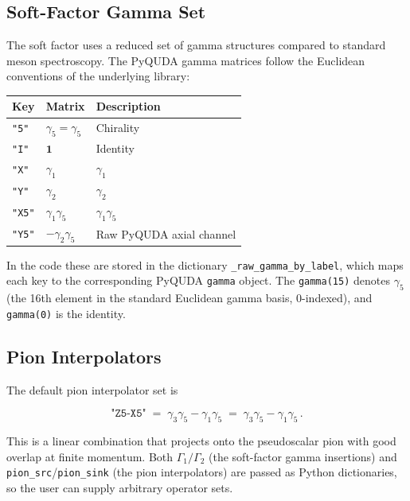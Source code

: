 \documentclass[11pt,a4paper]{article}
\newcommand{\Gfive}{\gamma_{5}}
\newcommand{\Gone}{\gamma_{1}}
\newcommand{\Gtwo}{\gamma_{2}}
\newcommand{\Gthree}{\gamma_{3}}
\newcommand{\walltag}[1]{\texttt{#1}}
\newcommand{\gI}{\mathbf{1}}
\begin{document}
\subsection{Soft-Factor Gamma Set}

The soft factor uses a reduced set of gamma structures compared to standard meson
spectroscopy.  The PyQUDA gamma matrices follow the Euclidean conventions of the
underlying library:

\begin{center}
\begin{tabular}{lll}
\toprule
Key & Matrix & Description \\
\midrule
\walltag{"5"}  & $\Gfive = \gamma_{5}$          & Chirality \\
\walltag{"I"}  & $\gI$                          & Identity \\
\walltag{"X"}  & $\Gone$                        & $\gamma_{1}$ \\
\walltag{"Y"}  & $\Gtwo$                        & $\gamma_{2}$ \\
\walltag{"X5"} & $\Gone\Gfive$                  & $\gamma_{1}\gamma_{5}$ \\
\walltag{"Y5"} & $-\Gtwo\Gfive$                 & Raw PyQUDA axial channel \\
\bottomrule
\end{tabular}
\end{center}

In the code these are stored in the dictionary \walltag{\_raw\_gamma\_by\_label},
which maps each key to the corresponding PyQUDA \walltag{gamma} object.  The
\walltag{gamma(15)} denotes $\Gfive$ (the 16th element in the standard Euclidean
gamma basis, 0-indexed), and \walltag{gamma(0)} is the identity.

\subsection{Pion Interpolators}

The default pion interpolator set is

\begin{equation}\label{eq:pion_interp}
\walltag{"Z5-X5"} \;=\; \Gthree\Gfive - \Gone\Gfive
   \;=\; \gamma_{3}\gamma_{5} - \gamma_{1}\gamma_{5}\, .
\end{equation}

This is a linear combination that projects onto the pseudoscalar pion with good
overlap at finite momentum.  Both $\Gamma_{1}/\Gamma_{2}$ (the soft-factor gamma
insertions) and \walltag{pion\_src}/\walltag{pion\_sink} (the pion interpolators)
are passed as Python dictionaries, so the user can supply arbitrary operator sets.
\end{document}
